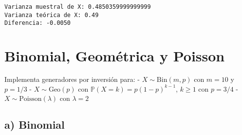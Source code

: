 \documentclass[11pt]{article}
\begin{document}
    \begin{Verbatim}[commandchars=\\\{\}]
Varianza muestral de X: 0.4850359999999999
Varianza teórica de X: 0.49
Diferencia: -0.0050
    \end{Verbatim}

    \hypertarget{binomial-geomuxe9trica-y-poisson}{%
\section{Binomial, Geométrica y
Poisson}\label{binomial-geomuxe9trica-y-poisson}}

    Implementa generadores por inversión para: - \(X\sim\mathrm{Bin}(m,p)\)
con \(m = 10\) y \(p = 1/3\) - \(X\sim\mathrm{Geo}(p)\) con
\(\mathbb P(X=k)=p(1-p)^{k-1}\), \(k\ge 1\) con \(p = 3/4\) -
\(X\sim\mathrm{Poisson}(\lambda)\) con \(\lambda = 2\)

    \hypertarget{a-binomial}{%
\subsection{a) Binomial}\label{a-binomial}}
\end{document}
